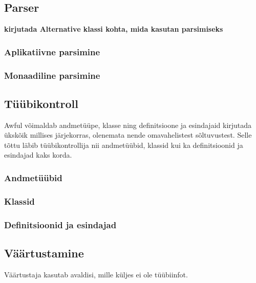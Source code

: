 \documentclass[12pt]{article}
\newcommand\markus[1]{\textcolor{roheline}{\textbf{#1}}}
\begin{document}
    \subsection{Parser}
      \markus{kirjutada Alternative klassi kohta, mida kasutan parsimiseks}
      \subsubsection{Aplikatiivne parsimine}
        
      \subsubsection{Monaadiline parsimine}
        
    \subsection{Tüübikontroll}
      Awful võimaldab andmetüüpe, klasse ning definitsioone ja esindajaid kirjutada ükskõik millises järjekorras, olenemata nende omavahelistest sõltuvustest. Selle tõttu läbib tüübikontrollija nii andmetüübid, klassid kui ka definitsioonid ja esindajad kaks korda.
      \subsubsection{Andmetüübid}
        
      \subsubsection{Klassid}
        
      \subsubsection{Definitsioonid ja esindajad}
        
    \subsection{Väärtustamine}
      Väärtustaja kasutab avaldisi, mille küljes ei ole tüübiinfot.
\begin{comment}
    Add_Int_expression_2 |
    Add_Int'_expression_2 Integer |
    Algebraic_expression_2 String [Expression_2] |
    Application_expression_2 Expression_2 Expression_2 |
    Field_expression_2 String |
    Function_expression_2 Pattern_0 Expression_2 |
    Match_expression_2 Expression_2 Matches_2 |
    Struct_expression_2 (Map' Expression_2) |
\end{comment}
\end{document}

